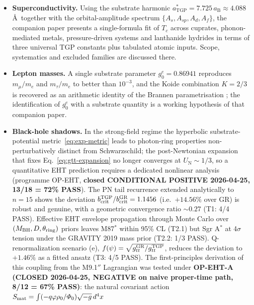 \documentclass[11pt,a4paper]{article}
\renewcommand{\Phi}{\varPhi}
\begin{document}
\begin{itemize}[nosep]
  \item \textbf{Superconductivity.} Using the substrate harmonic
    $a^{\ast}_{\mathrm{TGP}}=7.725\,a_{\mathrm{B}}\approx 4.088$\,\AA\
    together with the orbital-amplitude spectrum
    $\{A_{s},A_{sp},A_{d},A_{f}\}$, the companion paper \cite{TGP-SC}
    presents a single-formula fit of $T_{c}$ across cuprates,
    phonon-mediated metals, pressure-driven systems and lanthanide
    hydrides in terms of three universal TGP constants plus tabulated
    atomic inputs. Scope, systematics and excluded families are
    discussed there.
  \item \textbf{Lepton masses.} A single substrate parameter
    $g_{0}^{e}=0.86941$ reproduces $m_{\mu}/m_{e}$ and $m_{\tau}/m_{e}$
    to better than $10^{-3}$, and the Koide combination $K=2/3$ is
    recovered as an arithmetic identity of the Brannen parametrisation
    \cite{TGP-leptons}; the identification of $g_{0}^{e}$ with a
    substrate quantity is a working hypothesis of that companion paper.
  \item \textbf{Black-hole shadows.} In the strong-field regime the
    hyperbolic substrate-potential metric~\eqref{eq:exp-metric} leads to
    photon-ring properties non-perturbatively distinct from
    Schwarzschild; the post-Newtonian expansion that fixes
    Eq.~\eqref{eq:gtt-expansion} no longer converges at
    $U_{\mathrm{N}}\sim 1/3$, so a quantitative EHT prediction
    requires a dedicated nonlinear analysis (programme OP-EHT,
    \textbf{closed CONDITIONAL POSITIVE 2026-04-25, 13/18 = 72\% PASS}).
    The PN tail recurrence extended analytically to $n=15$ shows the
    deviation $b_{\rm crit}^{\rm TGP}/b_{\rm crit}^{\rm GR}=1.1456$
    (i.e.\ $+14.56\%$ over GR) is robust and genuine, with a geometric
    convergence ratio $\sim 0.27$ (T1: 4/4 PASS). Effective EHT envelope
    propagation through Monte Carlo over $(M_{\rm BH},D,\theta_{\rm ring})$
    priors leaves M87$^*$ within 95\% CL (T2.1) but Sgr A$^*$ at 4$\sigma$
    tension under the GRAVITY 2019 mass prior (T2.2: 1/3 PASS).
    Q-renormalization scenario (e), $f(\psi)=\sqrt{g_{tt}^{\rm GR}/g_{tt}^{\rm TGP}}$,
    reduces the deviation to $+1.46\%$ as a fitted ansatz (T3: 4/5 PASS).
    The first-principles derivation of this coupling from the M9.1$''$
    Lagrangian was tested under \textbf{OP-EHT-A (CLOSED 2026-04-25,
    NEGATIVE on naive proper-time path, 8/12 = 67\% PASS)}: the natural
    covariant action $S_{\rm mat}=\int (-q\varphi\rho_{0}/\Phi_{0})\sqrt{-g}\,d^{4}x$

\end{itemize}
\end{document}
